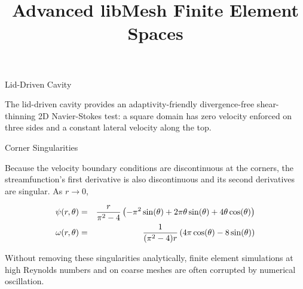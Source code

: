 \title{ Advanced libMesh Finite Element Spaces}
\maketitle

\begin{foil}{Lid-Driven Cavity}

The lid-driven cavity provides an adaptivity-friendly divergence-free
shear-thinning 2D Navier-Stokes test: a square domain has zero
velocity enforced on three sides and a constant lateral velocity along
the top.

\begin{center}

\end{center}

\end{foil}


\begin{foil}{Corner Singularities}

Because the velocity boundary conditions are discontinuous at the
corners, the streamfunction's first derivative is also discontinuous
and its second derivatives are singular.  As $r \rightarrow 0$,

\vspace{-2em}
\begin{eqnarray*}
\psi(r,\theta) & = & \frac{r}{\pi^2 - 4}
\left( -\pi^2 \sin(\theta) + 2 \pi \theta \sin(\theta) + 
4 \theta \cos(\theta) \right) \\
\omega(r, \theta) & = & \frac{1}{(\pi^2 - 4) r}
\left( 4 \pi \cos(\theta) - 8 \sin(\theta) \right)
\end{eqnarray*}
\vspace{-2em}

Without removing these singularities analytically, finite element
simulations at high Reynolds numbers and on coarse meshes are often
corrupted by numerical oscillation.

\end{foil}

